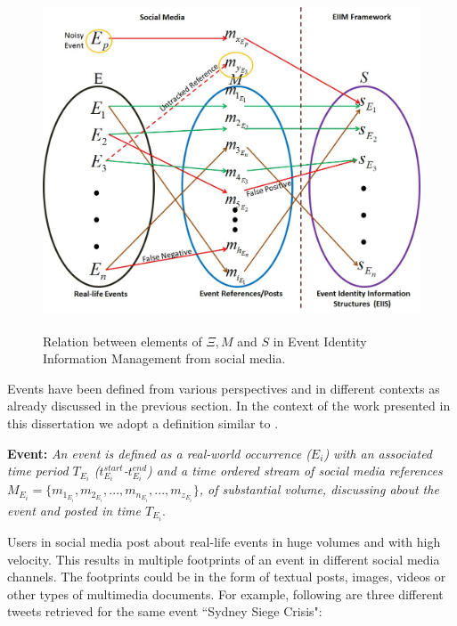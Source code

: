 %
%
%

\begin{figure}[htbp]
  \caption{Relation between elements of $\Xi,M$ and $S$ in Event Identity Information Management from social media.}
\label{eventresolutionmappings}
  \centering
    \includegraphics[width=12cm,height=10cm]{Figures/EventResolutionMappings.jpg}
\end{figure}


Events have been defined from various perspectives and in different contexts as already discussed in the previous section. In the context of the work presented in this dissertation we adopt a definition similar to \cite{becker2011beyond}. 


\textbf{Event:} \textit{An event is defined as a real-world occurrence ($ E_{i}$) with an associated time period $T_{E_{i}}$ ($t^{start}_{E_{i}}$-$t^{end}_{E_{i}}$) and a time ordered stream of social media references $M_{E_{i}} = {\{m_{1_{E_{i}}},m_{2_{E_{i}}}, ... ,m_{n_{E_{i}}}, ... ,m_{z_{E_{i}}}\}}$, of substantial volume, discussing about the event and posted in time $T_{E_{i}}$}.

Users in social media post about real-life events in huge volumes and with high velocity. This results in multiple footprints of an event in different social media channels. The footprints could be in the form of textual posts, images, videos or other types of multimedia documents. For example,
following are three different tweets retrieved for the same event ``Sydney Siege Crisis":

